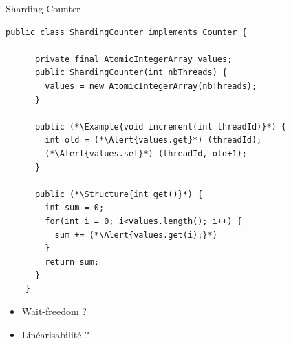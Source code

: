 
\begingroup

\begin{frame}[fragile]{Sharding Counter}

  \begin{lstlisting}[gobble=4]
    public class ShardingCounter implements Counter {

      private final AtomicIntegerArray values;
      public ShardingCounter(int nbThreads) {
        values = new AtomicIntegerArray(nbThreads);
      }
      
      public (*\Example{void increment(int threadId)}*) {
        int old = (*\Alert{values.get}*) (threadId);
        (*\Alert{values.set}*) (threadId, old+1);
      }

      public (*\Structure{int get()}*) {
        int sum = 0;
        for(int i = 0; i<values.length(); i++) {
          sum += (*\Alert{values.get(i);}*)
        }
        return sum;
      }
    }
  \end{lstlisting}

  \begin{itemize}
  \item Wait-freedom ?  
  \item Linéarisabilité ?  
  \end{itemize}


\end{frame}

\endgroup
\endinput
